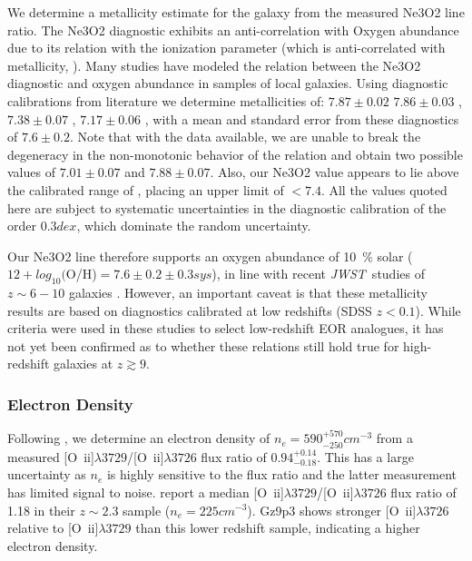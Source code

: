 \documentclass[sn-mathphys]{sn-jnl}%
\theoremstyle{thmstyleone}%
\theoremstyle{thmstyletwo}%
\theoremstyle{thmstylethree}%
\newcommand{\Oii}{[O~{\sc ii}]}
\newcommand{\jwst}{\textit{JWST}}
\begin{document}
We determine a metallicity estimate for the galaxy from the measured Ne3O2 line ratio. The Ne3O2 diagnostic exhibits an anti-correlation with Oxygen abundance \citep{Bian18, Jones15, Shi07, Nagao06, Perez-montero07} due to its relation with the ionization parameter (which is anti-correlated with metallicity, \cite{Jeong20, Levesque14}). Many studies have modeled the relation between the Ne3O2 diagnostic and oxygen abundance in samples of local galaxies. Using 
diagnostic calibrations from literature we determine metallicities of: $7.87\pm0.02$ \citep{Jones15} $7.86\pm0.03$ \citep{Bian18}, $7.38\pm0.07$ \citep{Maiolino_2008}, $7.17\pm0.06$ \citep{Shi07}, with a mean and standard error from these diagnostics of $7.6\pm0.2$. Note that with the data available, we are unable to break the degeneracy in the non-monotonic behavior of the \cite{Nakajima22} relation and obtain two possible values of $7.01\pm0.07$ and $7.88\pm0.07$. Also, our Ne3O2 value appears to lie above the calibrated range of \cite{Sanders21}, placing an upper limit of $<7.4$. All the values quoted here are subject to systematic uncertainties in the diagnostic calibration of the order $0.3dex$, which dominate the random uncertainty.


Our Ne3O2 line therefore supports an oxygen abundance of 10~\% solar ($12+log_{10}($O/H)$=7.6\pm0.2 \pm0.3sys$), in line with recent \jwst\ studies of $z\sim6-10$ galaxies \citep{Sanders23, Mascia23, Cameron23, Nakajima23}.
However, an important caveat is that these metallicity results are based on diagnostics calibrated at low redshifts (SDSS $z<0.1$). While  criteria were used in these studies to select low-redshift EOR analogues, it has not yet been confirmed as to whether these relations still hold true for high-redshift galaxies at $z\gtrsim9$.


\subsubsection{Electron Density}
Following \cite{Sanders16}, we determine an electron density of $n_e = 590^{+570}_{-250} cm^{-3}$ from a measured \Oii$\lambda3729$/\Oii$\lambda3726$ flux ratio of $0.94^{+0.14}_{-0.18}$. This has a large uncertainty as $n_e$ is highly sensitive to the flux ratio and the latter measurement has limited signal to noise. \cite{Sanders16} report a median \Oii$\lambda3729$/\Oii$\lambda3726$ flux ratio of 1.18 in their $z\sim2.3$ sample ($n_e=225cm^{-3}$). Gz9p3 shows stronger \Oii$\lambda3726$ relative to \Oii$\lambda3729$ than this lower redshift sample, indicating a higher electron density.
\end{document}
